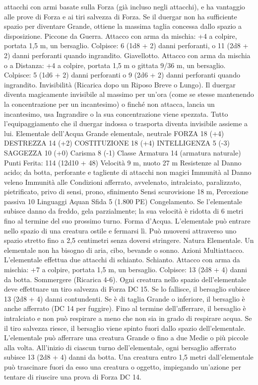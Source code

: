 \begin{multicols}{2}
attacchi con armi basate sulla Forza (già incluso negli attacchi), e
ha vantaggio alle prove di Forza e ai tiri salvezza di Forza. Se il
duergar non ha sufficiente spazio per diventare Grande, ottiene la
massima taglia concessa dallo spazio a disposizione.
Piccone da Guerra. Attacco con arma da mischia: +4 a colpire,
portata 1,5 m, un bersaglio.
Colpisce: 6 (1d8 + 2) danni perforanti, o 11 (2d8 + 2) danni
perforanti quando ingrandito.
Giavellotto. Attacco con arma da mischia o a Distanza: +4 a
colpire, portata 1,5 m o gittata 9/36 m, un bersaglio.
Colpisce: 5 (1d6 + 2) danni perforanti o 9 (2d6 + 2) danni
perforanti quando ingrandito.
Invisibilità (Ricarica dopo un Riposo Breve o Lungo). Il
duergar diventa magicamente invisibile al massimo per un’ora
(come se stesse mantenendo la concentrazione per un
incantesimo) o finché non attacca, lancia un incantesimo, usa
Ingrandire o la sua concentrazione viene spezzata. Tutto
l’equipaggiamento che il duergar indossa o trasporta diventa
invisibile assieme a lui.
Elementale dell’Acqua
Grande elementale, neutrale
FORZA 18 (+4)
DESTREZZA 14 (+2)
COSTITUZIONE 18 (+4)
INTELLIGENZA 5 (-3)
SAGGEZZA 10 (+0)
Carisma 8 (-1)
Classe Armatura 14 (armatura naturale)
\hspace*{0pt}\hfill{Punti Ferita}: 114 (12d10 + 48)
Velocità 9 m, nuoto 27 m
Resistenze al Danno acido; da botta, perforante e tagliente
di attacchi non magici
Immunità al Danno veleno
Immunità alle Condizioni afferrato, avvelenato, intralciato,
paralizzato, pietrificato, privo di sensi, prono, sfinimento
Sensi scurovisione 18 m, Percezione passiva 10
Linguaggi Aquan
Sfida 5 (1.800 PE)
Congelamento. Se l’elementale subisce danno da freddo, gela
parzialmente; la sua velocità è ridotta di 6 metri fino al termine
del suo prossimo turno.
Forma d’Acqua. L’elementale può entrare nello spazio di una
creatura ostile e fermarsi lì. Può muoversi attraverso uno spazio
stretto fino a 2,5 centimetri senza doversi stringere.
Natura Elementale. Un elementale non ha bisogno di aria, cibo,
bevande o sonno.
Azioni
Multiattacco. L’elementale effettua due attacchi di schianto.
Schianto. Attacco con arma da mischia: +7 a colpire, portata 1,5
m, un bersaglio.
Colpisce: 13 (2d8 + 4) danni da botta.
Sommergere (Ricarica 4-6). Ogni creatura nello spazio
dell’elementale deve effettuare un tiro salvezza di Forza DC 15.
Se lo fallisce, il bersaglio subisce 13 (2d8 + 4) danni
contundenti. Se è di taglia Grande o inferiore, il bersaglio è
anche afferrato (DC 14 per fuggire). Fino al termine
dell’afferrare, il bersaglio è intralciato e non può respirare a
meno che non sia in grado di respirare acqua. Se il tiro salvezza
riesce, il bersaglio viene spinto fuori dallo spazio
dell’elementale.
L’elementale può afferrare una creatura Grande o fino a due
Medie o più piccole alla volta. All’inizio di ciascun turno
dell’elementale, ogni bersaglio afferrato subisce 13 (2d8 + 4)
danni da botta. Una creatura entro 1,5 metri dall’elementale
può trascinare fuori da esso una creatura o oggetto, impiegando
un’azione per tentare di riuscire una prova di Forza DC 14.
 

\end{multicols}
